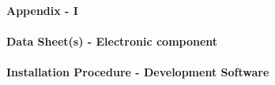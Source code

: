 \begin{center}
\thispagestyle{empty}
\vspace{2cm}
\LARGE{\textbf{Appendix - I}}\\[1.0cm]
\end{center}
\paragraph{Data Sheet(s) - Electronic component}  
\paragraph{Installation Procedure - Development Software}
